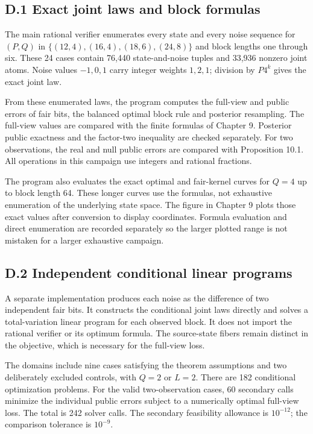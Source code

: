 \documentclass[
]{article}
\begin{document}
\subsection{D.1 Exact joint laws and block
formulas}\label{d.1-exact-joint-laws-and-block-formulas}

The main rational verifier enumerates every state and every noise
sequence for \((P,Q)\) in \(\{(12,4),(16,4),(18,6),(24,8)\}\) and block
lengths one through six. These 24 cases contain 76,440 state-and-noise
tuples and 33,936 nonzero joint atoms. Noise values \(-1,0,1\) carry
integer weights \(1,2,1\); division by \(P4^k\) gives the exact joint
law.

From these enumerated laws, the program computes the full-view and
public errors of fair bits, the balanced optimal block rule and
posterior resampling. The full-view values are compared with the finite
formulas of Chapter 9. Posterior public exactness and the factor-two
inequality are checked separately. For two observations, the real and
null public errors are compared with Proposition 10.1. All operations in
this campaign use integers and rational fractions.

The program also evaluates the exact optimal and fair-kernel curves for
\(Q=4\) up to block length 64. These longer curves use the formulas, not
exhaustive enumeration of the underlying state space. The figure in
Chapter 9 plots those exact values after conversion to display
coordinates. Formula evaluation and direct enumeration are recorded
separately so the larger plotted range is not mistaken for a larger
exhaustive campaign.

\subsection{D.2 Independent conditional linear
programs}\label{d.2-independent-conditional-linear-programs}

A separate implementation produces each noise as the difference of two
independent fair bits. It constructs the conditional joint laws directly
and solves a total-variation linear program for each observed block. It
does not import the rational verifier or its optimum formula. The
source-state fibers remain distinct in the objective, which is necessary
for the full-view loss.

The domains include nine cases satisfying the theorem assumptions and
two deliberately excluded controls, with \(Q=2\) or \(L=2\). There are
182 conditional optimization problems. For the valid two-observation
cases, 60 secondary calls minimize the individual public errors subject
to a numerically optimal full-view loss. The total is 242 solver calls.
The secondary feasibility allowance is \(10^{-12}\); the comparison
tolerance is \(10^{-9}\).
\end{document}
